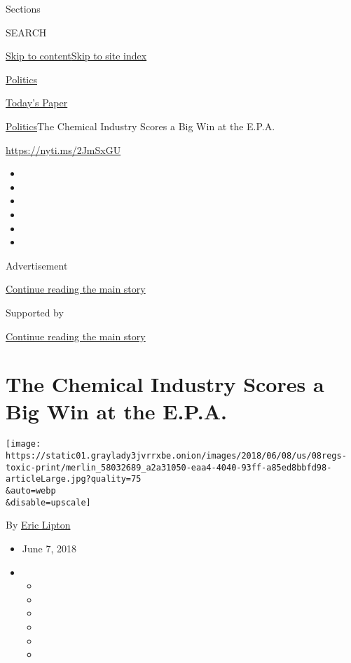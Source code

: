 Sections

SEARCH

\protect\hyperlink{site-content}{Skip to
content}\protect\hyperlink{site-index}{Skip to site index}

\href{https://www.nytimes3xbfgragh.onion/section/politics}{Politics}

\href{https://myaccount.nytimes3xbfgragh.onion/auth/login?response_type=cookie\&client_id=vi}{}

\href{https://www.nytimes3xbfgragh.onion/section/todayspaper}{Today's
Paper}

\href{/section/politics}{Politics}\textbar{}The Chemical Industry Scores
a Big Win at the E.P.A.

\url{https://nyti.ms/2JmSxGU}

\begin{itemize}
\item
\item
\item
\item
\item
\item
\end{itemize}

Advertisement

\protect\hyperlink{after-top}{Continue reading the main story}

Supported by

\protect\hyperlink{after-sponsor}{Continue reading the main story}

\hypertarget{the-chemical-industry-scores-a-big-win-at-the-epa}{%
\section{The Chemical Industry Scores a Big Win at the
E.P.A.}\label{the-chemical-industry-scores-a-big-win-at-the-epa}}

\texttt{[image: https://static01.graylady3jvrrxbe.onion/images/2018/06/08/us/08regs-toxic-print/merlin\_58032689\_a2a31050-eaa4-4040-93ff-a85ed8bbfd98-articleLarge.jpg?quality=75\\\&auto=webp\\\&disable=upscale]}

By \href{https://www.nytimes3xbfgragh.onion/by/eric-lipton}{Eric Lipton}

\begin{itemize}
\item
  June 7, 2018
\item
  \begin{itemize}
  \item
  \item
  \item
  \item
  \item
  \item
  \end{itemize}
\end{itemize}


